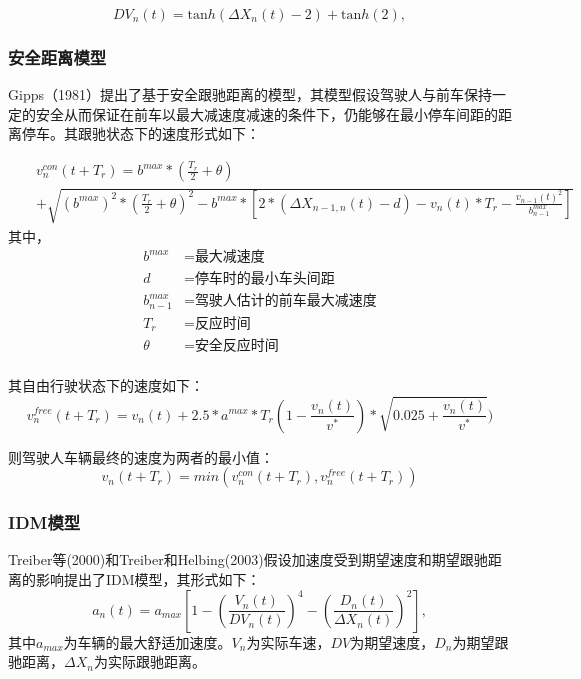 \begin{equation}
DV_n(t)=\mathrm{tan}h(\Delta X_n(t)-2)+\mathrm{tan}h(2),
\end{equation}

\subsubsection{安全距离模型}
Gipps（1981）\cite{Gipps1981}提出了基于安全跟驰距离的模型，其模型假设驾驶人与前车保持一定的安全从而保证在前车以最大减速度减速的条件下，仍能够在最小停车间距的距离停车。其跟驰状态下的速度形式如下：

\begin{eqnarray}
&&v_n^{con}(t+T_r)=b^{max}*(\frac{T_r}{2}+\theta)\nonumber\\
&&+\sqrt{(b^{max})^2*(\frac{T_r}{2}+\theta)^2-b^{max}*[2*(\Delta X_{n-1,n}(t)-d)-v_n(t)*T_r-\frac{v_{n-1}(t)^2}{b_{n-1}^{max}}]}
\end{eqnarray}
其中，
\begin{displaymath}
{\begin{aligned}
b^{max}&=\text{最大减速度}\\
d&=\text{停车时的最小车头间距}\\
b_{n-1}^{max}&=\text{驾驶人估计的前车最大减速度}\\
T_r&=\text{反应时间}\\
\theta&=\text{安全反应时间}\\
\end{aligned}}
\end{displaymath}

其自由行驶状态下的速度如下：
\begin{equation}
v_n^{free}(t+T_r)=v_n(t)+2.5*a^{max}*T_r(1-\frac{v_n(t)}{v^*})*\sqrt{0.025+\frac{v_n(t)}{v^*}})
\end{equation}

则驾驶人车辆最终的速度为两者的最小值：
\begin{equation}
v_n(t+T_r)=min(v_n^{con}(t+T_r),v_n^{free}(t+T_r))
\end{equation}

\subsubsection{IDM模型}
Treiber等(2000)\cite{Treiber2000}和Treiber和Helbing(2003)\cite{Treiber2003}假设加速度受到期望速度和期望跟驰距离的影响提出了IDM模型，其形式如下：
\begin{equation}
a_n(t)=a_{max}\left[1-\left(\frac{V_n(t)}{DV_n(t)}\right)^4-\left(\frac{D_n(t)}{\Delta X_n(t)}\right )^2\right],
\end{equation}
其中$a_{max}$为车辆的最大舒适加速度。$V_n$为实际车速，$DV$为期望速度，$D_n$为期望跟驰距离，$\Delta X_n$为实际跟驰距离。

